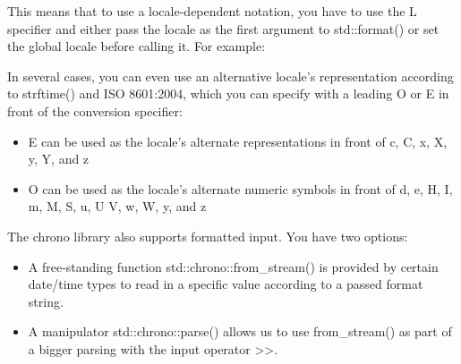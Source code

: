 This means that to use a locale-dependent notation, you have to use the L specifier and either pass the locale as the first argument to std::format() or set the global locale before calling it. For example:


In several cases, you can even use an alternative locale’s representation according to strftime() and ISO 8601:2004, which you can specify with a leading O or E in front of the conversion specifier:

\begin{itemize}
\item 
E can be used as the locale’s alternate representations in front of c, C, x, X, y, Y, and z

\item 
O can be used as the locale’s alternate numeric symbols in front of d, e, H, I, m, M, S, u, U V, w, W, y, and z
\end{itemize}


The chrono library also supports formatted input. You have two options:

\begin{itemize}
\item 
A free-standing function std::chrono::from\_stream() is provided by certain date/time types to read in a specific value according to a passed format string.

\item 
A manipulator std::chrono::parse() allows us to use from\_stream() as part of a bigger parsing with the input operator >{}>.
\end{itemize}



